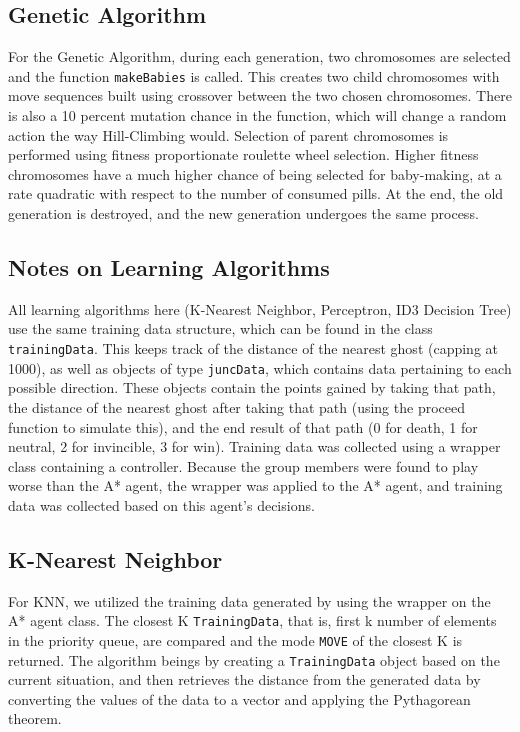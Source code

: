 \documentclass[a4paper]{article}
\begin{document}
\subsection{Genetic Algorithm}
For the Genetic Algorithm, during each generation, two chromosomes are selected and the function \texttt{makeBabies} is called.  This creates two child chromosomes with move sequences built using crossover between the two chosen chromosomes.  There is also a 10 percent mutation chance in the function, which will change a random action the way Hill-Climbing would.  Selection of parent chromosomes is performed using fitness proportionate roulette wheel selection.  Higher fitness chromosomes have a much higher chance of being selected for baby-making, at a rate quadratic with respect to the number of consumed pills.  At the end, the old generation is destroyed, and the new generation undergoes the same process.

\subsection{Notes on Learning Algorithms}
All learning algorithms here (K-Nearest Neighbor, Perceptron, ID3 Decision Tree) use the same training data structure, which can be found in the class \texttt{trainingData}.  This keeps track of the distance of the nearest ghost (capping at 1000), as well as objects of type \texttt{juncData}, which contains data pertaining to each possible direction.  These objects contain the points gained by taking that path, the distance of the nearest ghost after taking that path (using the proceed function to simulate this), and the end result of that path (0 for death, 1 for neutral, 2 for invincible, 3 for win).  
\newline
Training data was collected using a wrapper class containing a controller.  Because the group members were found to play worse than the A* agent, the wrapper was applied to the A* agent, and training data was collected based on this agent's decisions.

\subsection{K-Nearest Neighbor}
For KNN, we utilized the training data generated by using the wrapper on the A* agent class. The closest K \texttt{TrainingData}, that is, first k number of elements in the priority queue, are compared and the mode \texttt{MOVE} of the closest K is returned.  The algorithm beings by creating a \texttt{TrainingData} object based on the current situation, and then retrieves the distance from the generated data by converting the values of the data to a vector and applying the Pythagorean theorem.
\end{document}
